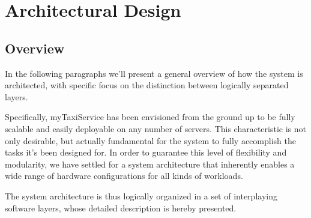 \chapter{Architectural Design}
  
\section{Overview}
In the following paragraphs we'll present a general overview of how the system is architected, with specific focus on the distinction between logically separated layers.

Specifically, myTaxiService has been envisioned from the ground up to be fully scalable and easily deployable on any number of servers. This characteristic is not only desirable, but actually fundamental for the system to fully accomplish the tasks it's been designed for. In order to guarantee this level of flexibility and modularity, we have settled for a system architecture that inherently enables a wide range of hardware configurations for all kinds of workloads.

The system architecture is thus logically organized in a set of interplaying software layers, whose detailed description is hereby presented.

